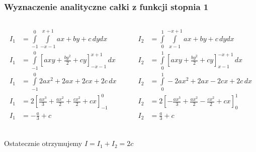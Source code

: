 \documentclass[9pt]{beamer}
\begin{document}
    \begin{frame}
        \frametitle{Wyznaczenie analityczne całki z funkcji stopnia 1}
        \begin{columns}
            \begin{column}{0.6\textwidth}
                \begin{align*}
                    I_1 &= \int\limits_{-1}^{0}\int\limits_{-x-1}^{x+1} ax+by+c \,dydx \\
                    I_1 &= \int\limits_{-1}^{0}\left[axy + \frac{by^2}{2} + cy\right]_{-x-1}^{x+1} \,dx \\
                    I_1 &= \int\limits_{-1}^{0} 2ax^2 + 2ax + 2cx + 2c \,dx \\
                    I_1 &= 2\left[ \frac{ax^3}{3} + \frac{ax^2}{2} + \frac{cx^2}{2} + cx \right]_{-1}^{0} \\
                    I_1 &= -\frac{a}{3} + c \\
                \end{align*}
            \end{column}
            \begin{column}{0.6\textwidth}
                \begin{align*}
                    I_2 &= \int\limits_{0}^{1}\int\limits_{x-1}^{-x+1} ax+by+c \,dydx \\
                    I_2 &= \int\limits_{0}^{1}\left[axy + \frac{by^2}{2} + cy\right]_{x-1}^{-x+1} \,dx \\
                    I_2 &= \int\limits_{0}^{1} - 2ax^2 + 2ax - 2cx + 2c \,dx \\
                    I_2 &= 2\left[ -\frac{ax^3}{3} + \frac{ax^2}{2} - \frac{cx^2}{2} + cx \right]_{0}^{1} \\
                    I_2 &= \frac{a}{3} + c \\
                \end{align*}
            \end{column}
        \end{columns}

        \begin{center}
            Ostatecznie otrzymujemy $ I = I_1 + I_2 = 2c $
        \end{center}

    \end{frame}
\end{document}
